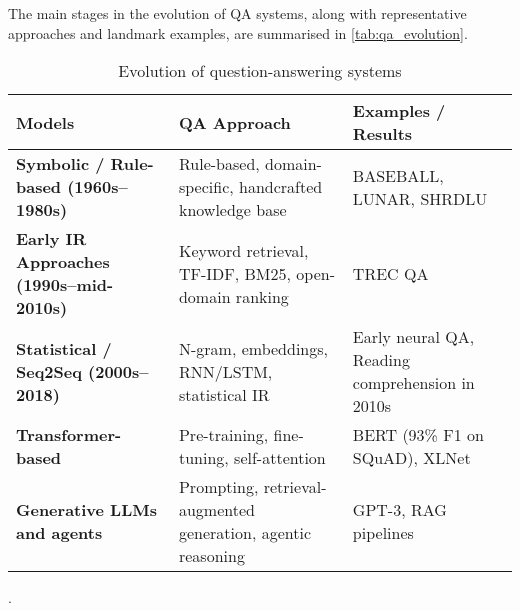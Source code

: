\begin{spacing}{1.5}
The main stages in the evolution of QA systems, along with representative approaches and landmark examples, are summarised in \autoref{tab:qa_evolution}.

\addtocounter{table}{-1}
\begin{table}[H]
\centering
\begin{tabularx}{\textwidth}{>{\raggedright\arraybackslash\bfseries}X >{\raggedright\arraybackslash}X >{\raggedright\arraybackslash}X}
\toprule
\textbf{Models} & \textbf{QA Approach} & \textbf{Examples / Results}\\
\midrule
Symbolic / Rule-based (1960s–1980s) & Rule-based, domain-specific, handcrafted knowledge base & BASEBALL, LUNAR, SHRDLU \\
Early IR Approaches (1990s–mid-2010s) & Keyword retrieval, TF-IDF, BM25, open-domain ranking & TREC QA \\
Statistical / Seq2Seq (2000s–2018) & N-gram, embeddings, RNN/LSTM, statistical IR & Early neural QA, Reading comprehension in 2010s \\
Transformer-based & Pre-training, fine-tuning, self-attention & BERT (93\% F1 on SQuAD), XLNet \\
Generative LLMs and agents & Prompting, retrieval-augmented generation, agentic reasoning & GPT-3, RAG pipelines \\
\bottomrule
\end{tabularx}
\vspace{0.5em}
\caption{Evolution of question-answering systems}.
\label{tab:qa_evolution}
\end{table}

\end{spacing}
